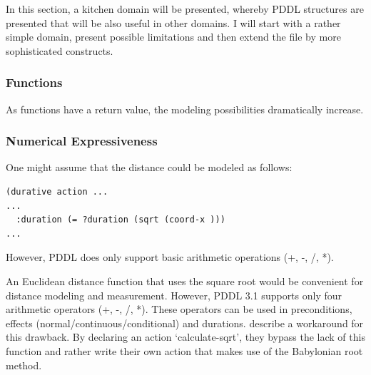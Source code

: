 \documentclass[11pt]{article}
\begin{document}
In this section, a kitchen domain will be presented, whereby PDDL
structures are presented that will be also useful in other domains. I
will start with a rather simple domain, present possible limitations
and then extend the file by more sophisticated constructs.
\subsubsection{Functions}
\label{sec-4-4-1}
As functions have a return value, the modeling possibilities
dramatically increase.

\subsubsection{Numerical Expressiveness}
\label{sec-4-4-2}
One might assume that the distance could be modeled as follows:

\begin{verbatim}
(durative action ...
...
  :duration (= ?duration (sqrt (coord-x )))
...
\end{verbatim}

However, PDDL does only support basic arithmetic operations (+, -, /, *).

An Euclidean distance function that uses the square root would be
convenient for distance modeling and measurement. However, PDDL 3.1
supports only four arithmetic operators (+, -, /, *). These
operators can be used in preconditions, effects
(normal/continuous/conditional) and durations.
\textcite{parkinson2012increasing} describe a workaround for this
drawback. By declaring an action `calculate-sqrt', they bypass the
lack of this function and rather write their own action that makes use
of the Babylonian root method.
\end{document}
